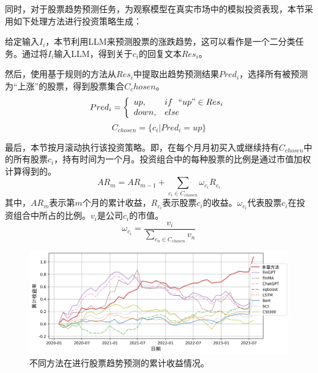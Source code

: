 同时，对于股票趋势预测任务，为观察模型在真实市场中的模拟投资表现，本节采用如下处理方法进行投资策略生成：

给定输入$I_i$，本节利用LLM来预测股票的涨跌趋势，这可以看作是一个二分类任务。通过将$I_i$输入LLM，得到关于$c_i$的回复文本$Res_i$。

然后，使用基于规则的方法从$Res_i$中提取出趋势预测结果$Pred_i$，选择所有被预测为“上涨”的股票，得到股票集合$C_chosen$。
\begin{equation}
    Pred_i = \left\{ 
        \begin{array}{ll}
            up, & if\ \ ``up" \in Res_i \\
            down, & else \\
        \end{array}
    \right.
\end{equation}
\begin{equation}
	C_{chosen}= \{c_i | Pred_i = up\}
\end{equation}

最后，本节按月滚动执行该投资策略。即，在每个月月初买入或继续持有$C_{chosen}$中的所有股票$c_i$，持有时间为一个月。投资组合中的每种股票的比例是通过市值加权计算得到的。
\begin{equation}
	AR_m = AR_{m-1} + \sum_{c_i \in C_{chosen}}\omega_{c_i} R_{c_i}
\end{equation}
其中，$AR_m$表示第$m$个月的累计收益，$R_{c_i}$表示股票$c_i$的收益。$\omega_{c_i}$代表股票$c_i$在投资组合中所占的比例。$v_i$是公司$c_i$的市值。
\begin{equation}
	\omega_{c_i} = \frac{v_i}{\sum_{c_n \in C_{chosen}}v_n}
\end{equation}

\begin{figure}[htbp]
	\centering
	\includegraphics[scale=0.54]{Fig/stock_trend_exp.png}
	\caption{\label{stock_trend_exp}不同方法在进行股票趋势预测的累计收益情况。}
\end{figure}

